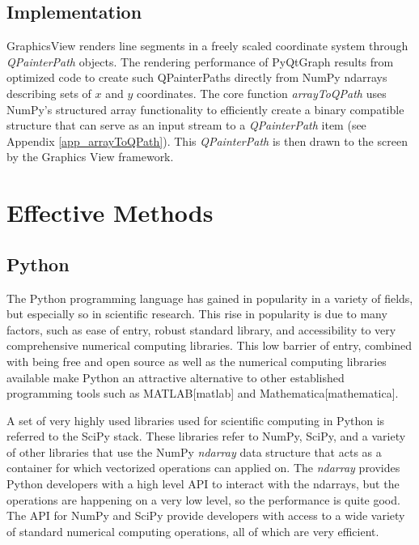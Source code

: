 \documentclass[journal]{vgtc}                %
\begin{document}
\subsection{Implementation}
GraphicsView renders line segments in a freely scaled coordinate system through \emph{QPainterPath} objects. The rendering performance of PyQtGraph results from optimized code to create such QPainterPaths directly from NumPy ndarrays describing sets of $x$ and $y$ coordinates. The core function \emph{arrayToQPath} uses NumPy's structured array functionality to efficiently create a binary compatible structure that can serve as an input stream to a \emph{QPainterPath} item (see Appendix \ref{app_arrayToQPath}). This \emph{QPainterPath} is then drawn to the screen by the Graphics View framework.


\section{Effective Methods}
\subsection{Python}



The Python programming language has gained in popularity in a variety of fields, but especially so in scientific research.  This rise in popularity is due to many factors, such as ease of entry, robust standard library, and accessibility to very comprehensive numerical computing libraries.  This low barrier of entry, combined with being free and open source as well as the numerical computing libraries available make Python an attractive alternative to other established programming tools such as MATLAB[matlab] and Mathematica[mathematica].  

A set of very highly used libraries used for scientific computing in Python is referred to the SciPy stack.  These libraries refer to NumPy, SciPy, and a variety of other libraries that use the NumPy \emph{ndarray} data structure that acts as a container for which vectorized operations can applied on.  The \emph{ndarray} provides Python developers with a high level API to interact with the ndarrays, but the operations are happening on a very low level, so the performance is quite good.  The API for NumPy and SciPy provide developers with access to a wide variety of standard numerical computing operations, all of which are very efficient.
\end{document}

